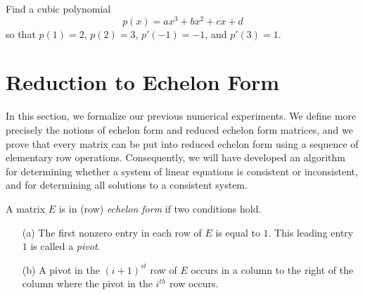 \documentclass{ximera}
\begin{document}
\begin{exercise} \label{c2.3.5}
Find a cubic polynomial
\[
p(x) = ax^3 + bx^2 + cx + d
\]
so that $p(1)=2$, $p(2)=3$, $p'(-1)=-1$, and $p'(3)=1$.
\end{exercise}



\section{Reduction to Echelon Form}
\label{S:2.4}

In this section, we formalize our previous numerical
experiments.  We define more precisely the notions of echelon
form and reduced echelon form matrices, and we prove that every
matrix can be put into reduced echelon form using a sequence of
elementary row operations.  Consequently, we will have developed
an algorithm for determining whether a system of linear
equations is consistent or inconsistent, and for determining all
solutions to a consistent system.

\begin{Def}
A matrix $E$ is in (row) {\em echelon form\/}  if two conditions hold.
\begin{enumerate}
\item[(a)] The first nonzero entry in each row of $E$ is equal
to $1$.  This leading entry $1$ is called a {\em pivot\/}. 
\item[(b)] A pivot in the $(i+1)^{st}$ row of $E$ occurs in a column to
the right of the column where the pivot in the $i^{th}$ row occurs.
\end{enumerate}
\end{Def}
\end{document}
